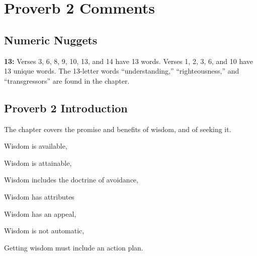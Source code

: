 \section{Proverb 2 Comments}

\subsection{Numeric Nuggets}
\textbf{13:} Verses 3, 6, 8, 9, 10, 13, and 14 have 13 words. Verses 1, 2, 3, 6, and 10 have 13 unique words. The 13-letter words ``understanding,'' ``righteousness,'' and ``transgressors'' are found in the chapter.

\subsection{Proverb 2 Introduction}
The chapter covers the promise and benefits of wisdom, and of seeking it. 
\begin{compactenum}
    \item Wisdom is available,
    \item Wisdom is attainable,
    \item Wisdom includes the doctrine of avoidance,
    \item Wisdom has attributes
    \item Wisdom has an appeal,
    \item Wisdom is not automatic,
    \item Getting wisdom must include an action plan.
\end{compactenum}